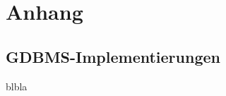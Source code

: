 \chapter{Anhang }
\label{cha:Anhang}

\section{GDBMS-Implementierungen}
\label{anh:vendor_list}

blbla